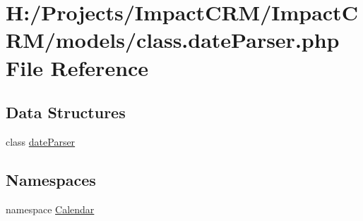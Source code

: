 \hypertarget{class_8dateParser_8php}{
\section{H:/Projects/ImpactCRM/ImpactCRM/models/class.dateParser.php File Reference}
\label{class_8dateParser_8php}
}
\subsection*{Data Structures}
\begin{DoxyCompactItemize}
\item 
class \hyperlink{classdateParser}{dateParser}
\end{DoxyCompactItemize}
\subsection*{Namespaces}
\begin{DoxyCompactItemize}
\item 
namespace \hyperlink{namespaceCalendar}{Calendar}
\end{DoxyCompactItemize}
